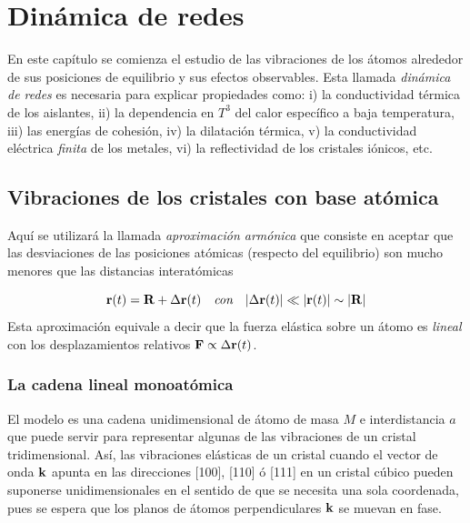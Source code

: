 
\chapter{Dinámica de redes} \label{Ch:04}

En este capítulo se comienza el estudio de las vibraciones de los átomos alrededor de sus posiciones de equilibrio y sus efectos observables. Esta llamada \textit{dinámica de redes} es necesaria para explicar propiedades como: i) la conductividad térmica de los aislantes, ii) la dependencia en $T^3$ del calor específico a baja temperatura, iii) las energías de cohesión, iv) la dilatación térmica, v) la conductividad eléctrica \textit{finita} de los metales, vi) la reflectividad de los cristales iónicos, etc.


\section{Vibraciones de los cristales con base atómica}

Aquí se utilizará la llamada \textit{aproximación armónica} que consiste en aceptar que las desviaciones de las posiciones atómicas (respecto del equilibrio) son mucho menores que las distancias interatómicas 

\begin{equation}
	\mathbf{r} (t) = \mathbf{R} + \Delta  \mathbf{r} (t)  \quad \textit{con} \quad |\Delta \mathbf{r} (t) | \ll |\mathbf{r} (t)| \sim |\mathbf{R}|
\end{equation}
Esta aproximación equivale a decir que la fuerza elástica sobre un átomo es \textit{lineal} con los desplazamientos relativos $\mathbf{F} \propto \Delta \mathbf{r} (t)$.

\subsection{La cadena lineal monoatómica}

El modelo es una cadena unidimensional de átomo de masa $M$ e interdistancia $a$ que puede servir para representar algunas de las vibraciones de un cristal tridimensional. Así, las vibraciones elásticas de un cristal cuando el vector de onda $\mathbf{k}$ apunta en las direcciones [100], [110]  ó [111] en un cristal cúbico pueden suponerse unidimensionales en el sentido de que se necesita una sola coordenada, pues se espera que los planos de átomos perpendiculares $\mathbf{k}$ se muevan en fase. 


